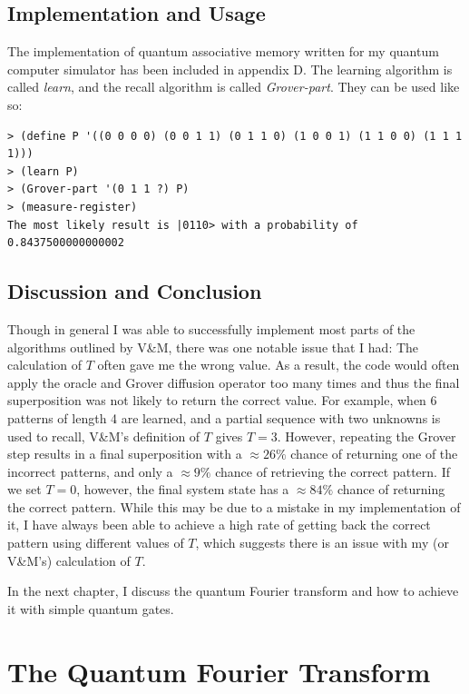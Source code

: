 \documentclass[11pt]{report}
\newcommand{\?}{\stackrel{?}{=}}
\begin{document}
\section{Implementation and Usage}
The implementation of quantum associative memory written for my quantum computer simulator has been included in appendix D. The learning algorithm is called \textit{learn}, and the recall algorithm is called \textit{Grover-part}. They can be used like so:
	
\begin{verbatim}
> (define P '((0 0 0 0) (0 0 1 1) (0 1 1 0) (1 0 0 1) (1 1 0 0) (1 1 1 1)))
> (learn P)
> (Grover-part '(0 1 1 ?) P)
> (measure-register)
The most likely result is |0110> with a probability of 0.8437500000000002
\end{verbatim}

\section{Discussion and Conclusion}

Though in general I was able to successfully implement most parts of the algorithms outlined by V\&M, there was one notable issue that I had: The calculation of $T$ often gave me the wrong value. As a result, the code would often apply the oracle and Grover diffusion operator too many times and thus the final superposition was not likely to return the correct value. For example, when 6 patterns of length 4 are learned, and a partial sequence with two unknowns is used to recall, V\&M's definition of $T$ gives $T=3$. However, repeating the Grover step results in a final superposition with a $\approx 26\%$ chance of returning one of the incorrect patterns, and only a $\approx 9\%$ chance of retrieving the correct pattern. If we set $T=0$, however, the final system state has a $\approx84\%$ chance of returning the correct pattern. While this may be due to a mistake in my implementation of it, I have always been able to achieve a high rate of getting back the correct pattern using different values of $T$, which suggests there is an issue with my (or V\&M's) calculation of $T$.

In the next chapter, I discuss the quantum Fourier transform and how to achieve it with simple quantum gates.

\chapter{The Quantum Fourier Transform}
\end{document}
